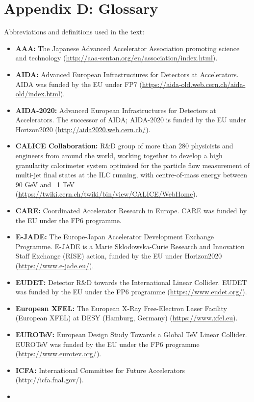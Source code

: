 \documentclass[%
 reprint,
 amsmath,amssymb,
 aps,
]{revtex4-1}
\begin{document}
\section*{\label{Appendix4} \Large{Appendix D: Glossary} }
Abbreviations and definitions used in the text:
\begin{itemize}
\item
\textbf{AAA:} The Japanese Advanced Accelerator Association promoting science and technology (\url{http://aaa-sentan.org/en/association/index.html}).
\item
\textbf{AIDA:} Advanced European Infrastructures for Detectors at Accelerators. AIDA was funded by the EU under FP7 (\url{https://aida-old.web.cern.ch/aida-old/index.html}).
\item
\textbf{AIDA-2020:} Advanced European Infrastructures for Detectors at Accelerators. The successor of AIDA; AIDA-2020 is funded by the EU under Horizon2020 (\url{http://aida2020.web.cern.ch/}).
\item
\textbf{CALICE Collaboration:} R\&D group of more than 280 physicists and engineers from around the world, working together to develop a high granularity calorimeter system optimised for the particle flow measurement of multi-jet final states at the ILC running, with centre-of-mass energy between 90 GeV and ~1 TeV (\url{https://twiki.cern.ch/twiki/bin/view/CALICE/WebHome}).
\item
\textbf{CARE:} Coordinated Accelerator Research in Europe. CARE was funded by the EU under the FP6 programme.
\item
\textbf{E-JADE:} The Europe-Japan Accelerator Development Exchange Programme. E-JADE is a Marie Sklodowska-Curie Research and Innovation Staff Exchange (RISE) action, funded by the EU under Horizon2020 (\url{https://www.e-jade.eu/}).
\item
\textbf{EUDET:} Detector R\&D towards the International Linear Collider. EUDET was funded by the EU under the FP6 programme (\url{https://www.eudet.org/}).
\item
\textbf{European XFEL:} The European X-Ray Free-Electron Laser Facility (European XFEL) at DESY (Hamburg, Germany) (\url{https://www.xfel.eu}).
\item
\textbf{EUROTeV:} European Design Study Towards a Global TeV Linear Collider. EUROTeV was funded by the EU under the FP6 programme (\url{https://www.eurotev.org/}).
\item
\textbf{ICFA:} International Committee for Future Accelerators (http://icfa.fnal.gov/).
\item

\end{itemize}
\end{document}

